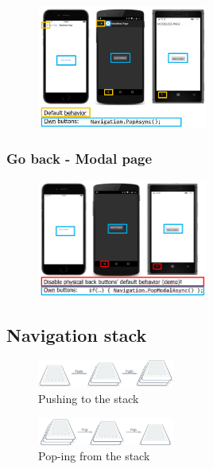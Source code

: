 \documentclass{article}
\begin{document}
\begin{figure}[H]
    \centering
    \includegraphics[width=0.5\textwidth]{navigation-back-modeless.png}
    \caption{}
\end{figure}

\subsubsection{Go back - Modal page}

\begin{figure}[H]
    \centering
    \includegraphics[width=0.5\textwidth]{navigation-back-modal.png}
    \caption{}
\end{figure}

\subsection{Navigation stack}

\begin{figure}[H]
    \centering
    \includegraphics[width=0.4\textwidth]{navigation-stack-1.png}
    \caption{Pushing to the stack}
\end{figure}


\begin{figure}[H]
    \centering
    \includegraphics[width=0.4\textwidth]{navigation-stack-2.png}
    \caption{Pop-ing from the stack}
\end{figure}
\end{document}
